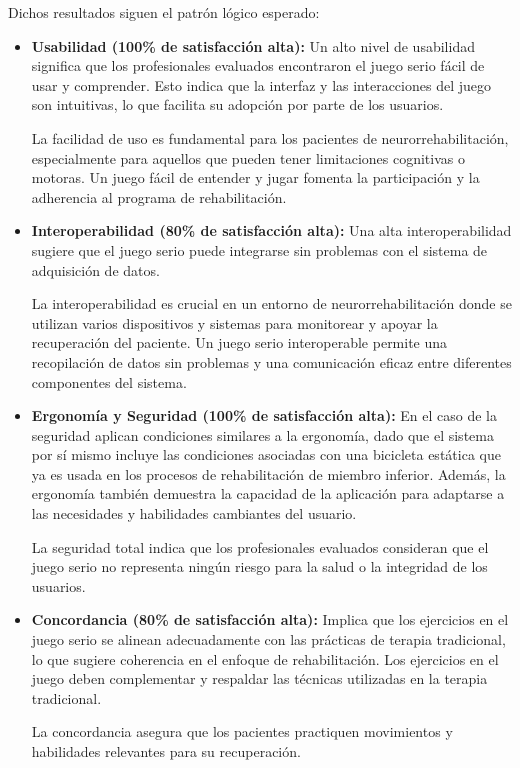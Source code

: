 Dichos resultados siguen el patrón lógico esperado:
\begin{itemize}
    \item \textbf{Usabilidad (100\% de satisfacción alta):} Un alto nivel de usabilidad significa que los profesionales evaluados encontraron el juego serio fácil de usar y comprender. Esto indica que la interfaz y las interacciones del juego son intuitivas, lo que facilita su adopción por parte de los usuarios.
    
    La facilidad de uso es fundamental para los pacientes de neurorrehabilitación, especialmente para aquellos que pueden tener limitaciones cognitivas o motoras. Un juego fácil de entender y jugar fomenta la participación y la adherencia al programa de rehabilitación.


    \item \textbf{Interoperabilidad (80\% de satisfacción alta):} Una alta interoperabilidad sugiere que el juego serio puede integrarse sin problemas con el sistema de adquisición de datos.
    
    La interoperabilidad es crucial en un entorno de neurorrehabilitación donde se utilizan varios dispositivos y sistemas para monitorear y apoyar la recuperación del paciente. Un juego serio interoperable permite una recopilación de datos sin problemas y una comunicación eficaz entre diferentes componentes del sistema.


    \item \textbf{Ergonomía y Seguridad (100\% de satisfacción alta):} En el caso de la seguridad aplican condiciones similares a la ergonomía, dado que el sistema por sí mismo incluye las condiciones asociadas con una bicicleta estática que ya es usada en los procesos de rehabilitación de miembro inferior. Además, la ergonomía también demuestra la capacidad de la aplicación para adaptarse a las necesidades y habilidades cambiantes del usuario. 
    
    La seguridad total indica que los profesionales evaluados consideran que el juego serio no representa ningún riesgo para la salud o la integridad de los usuarios.
    
    \item \textbf{Concordancia (80\% de satisfacción alta):} Implica que los ejercicios en el juego serio se alinean adecuadamente con las prácticas de terapia tradicional, lo que sugiere coherencia en el enfoque de rehabilitación. Los ejercicios en el juego deben complementar y respaldar las técnicas utilizadas en la terapia tradicional. 
    
    La concordancia asegura que los pacientes practiquen movimientos y habilidades relevantes para su recuperación.
\end{itemize}

